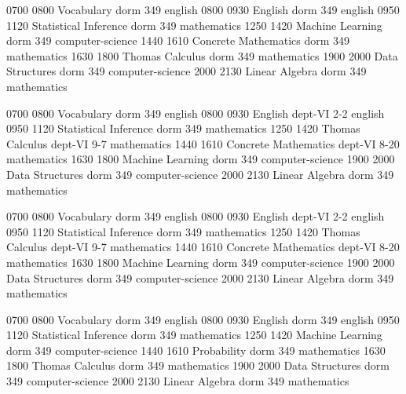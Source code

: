 \documentclass[a4paper,10pt]{report}
\begin{document}
\begin{landscape}
\begin{timetable}
   {0700} {0800}   {Vocabulary}                 {}      {dorm 349}      {english}
   {0800} {0930}   {English}                    {}      {dorm 349}      {english}
   {0950} {1120}   {Statistical Inference}      {}      {dorm 349}      {mathematics}
   {1250} {1420}   {Machine Learning}           {}      {dorm 349}      {computer-science}
   {1440} {1610}   {Concrete Mathematics}       {}      {dorm 349}      {mathematics}
   {1630} {1800}   {Thomas Calculus}            {}      {dorm 349}      {mathematics}
   {1900} {2000}   {Data Structures}            {}      {dorm 349}      {computer-science}
   {2000} {2130}   {Linear Algebra}             {}      {dorm 349}      {mathematics}
  

   {0700} {0800}   {Vocabulary}                 {}      {dorm 349}      {english}
   {0800} {0930}   {English}                    {}      {dept-VI 2-2}   {english}
   {0950} {1120}   {Statistical Inference}      {}      {dorm 349}      {mathematics}
   {1250} {1420}   {Thomas Calculus}            {}      {dept-VI 9-7}   {mathematics}
   {1440} {1610}   {Concrete Mathematics}       {}      {dept-VI 8-20}  {mathematics}
   {1630} {1800}   {Machine Learning}           {}      {dorm 349}      {computer-science}
   {1900} {2000}   {Data Structures}            {}      {dorm 349}      {computer-science}
   {2000} {2130}   {Linear Algebra}             {}      {dorm 349}      {mathematics}
  

   {0700} {0800}   {Vocabulary}                 {}      {dorm 349}      {english}
   {0800} {0930}   {English}                    {}      {dept-VI 2-2}   {english}
   {0950} {1120}   {Statistical Inference}      {}      {dorm 349}      {mathematics}
   {1250} {1420}   {Thomas Calculus}            {}      {dept-VI 9-7}   {mathematics}
   {1440} {1610}   {Concrete Mathematics}       {}      {dept-VI 8-20}  {mathematics}
   {1630} {1800}   {Machine Learning}           {}      {dorm 349}      {computer-science}
   {1900} {2000}   {Data Structures}            {}      {dorm 349}      {computer-science}
   {2000} {2130}   {Linear Algebra}             {}      {dorm 349}      {mathematics}
  

   {0700} {0800}   {Vocabulary}                 {}      {dorm 349}      {english}
   {0800} {0930}   {English}                    {}      {dorm 349}      {english}
   {0950} {1120}   {Statistical Inference}      {}      {dorm 349}      {mathematics}
   {1250} {1420}   {Machine Learning}           {}      {dorm 349}      {computer-science}
   {1440} {1610}   {Probability}                {}      {dorm 349}      {mathematics}
   {1630} {1800}   {Thomas Calculus}            {}      {dorm 349}      {mathematics}
   {1900} {2000}   {Data Structures}            {}      {dorm 349}      {computer-science}
   {2000} {2130}   {Linear Algebra}             {}      {dorm 349}      {mathematics}
  


\end{timetable}
\end{landscape}
\end{document}
